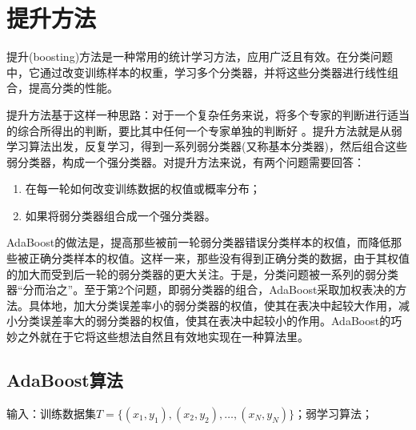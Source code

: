 \section{提升方法}
提升(boosting)方法是一种常用的统计学习方法，应用广泛且有效。在分类问题中，它通过改变训练样本的权重，学习多个分类器，并将这些分类器进行线性组合，提高分类的性能。

提升方法基于这样一种思路：对于一个复杂任务来说，将多个专家的判断进行适当的综合所得出的判断，要比其中任何一个专家单独的判断好 。提升方法就是从弱学习算法出发，反复学习，得到一系列弱分类器(又称基本分类器)，然后组合这些弱分类器，构成一个强分类器。对提升方法来说，有两个问题需要回答：
\begin{enumerate}
	\item 在每一轮如何改变训练数据的权值或概率分布；
	\item 如果将弱分类器组合成一个强分类器。
\end{enumerate}
AdaBoost的做法是，提高那些被前一轮弱分类器错误分类样本的权值，而降低那些被正确分类样本的权值。这样一来，那些没有得到正确分类的数据，由于其权值的加大而受到后一轮的弱分类器的更大关注。于是，分类问题被一系列的弱分类器“分而治之”。至于第2个问题，即弱分类器的组合，AdaBoost采取加权表决的方法。具体地，加大分类误差率小的弱分类器的权值，使其在表决中起较大作用，减小分类误差率大的弱分类器的权值，使其在表决中起较小的作用。AdaBoost的巧妙之外就在于它将这些想法自然且有效地实现在一种算法里。

\subsection*{AdaBoost算法}
输入：训练数据集$T=\{(x_1,y_1),(x_2,y_2),\dots,(x_N,y_N)\}$；弱学习算法；


